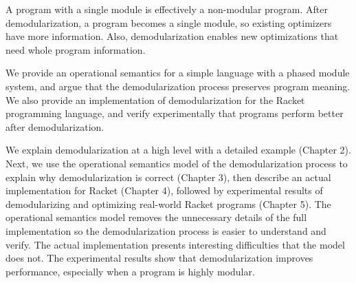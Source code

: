A program with a single module is effectively a non-modular program. After demodularization, a program becomes a single module, so existing optimizers have more information. Also, demodularization enables new optimizations that need whole program information. 

We provide an operational semantics for a simple language with a phased module system, and argue that the demodularization process preserves program meaning. We also provide an implementation of demodularization for the Racket programming language, and verify experimentally that programs perform better after demodularization.

We explain demodularization at a high level with a detailed example (Chapter 2).
Next, we use the operational semantics model of the demodularization process to explain why demodularization is correct (Chapter 3), then describe an actual implementation for Racket (Chapter 4), followed by experimental results of demodularizing and optimizing real-world Racket programs (Chapter 5). 
The operational semantics model removes the unnecessary details of the full implementation so the demodularization process is easier to understand and verify. 
The actual implementation presents interesting difficulties that the model does not.
The experimental results show that demodularization improves performance, especially when a program is highly modular. 
